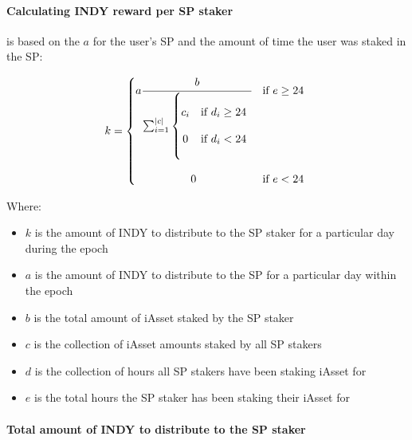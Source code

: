 \documentclass{article}
\begin{document}
\begin{sloppypar}
\filbreak

\hypertarget{calculating-indy-reward-per-sp-staker}{%
\paragraph{Calculating INDY reward per SP
staker}\label{calculating-indy-reward-per-sp-staker}}

is based on the \(a\) for the user's SP and the amount of time the user
was staked in the SP:

\[k = \left\{ \begin{matrix}
  a \cfrac{b}{\sum_{i = 1}^{\left| c \right|}\left\{ \begin{matrix}
    \\
    c_{i} & \text{if\ }d_{i} \geq 24 \\ \\
    0 & \text{if\ }d_{i} < 24 \\ \\
    \end{matrix} \right.\ } & \text{if\ }e \geq 24 \\ \\
  0 & \text{if\ }e < 24 \\
  \end{matrix} \right.\ \]

Where:

\begin{itemize}
\item
  \(k\) is the amount of INDY to distribute to the SP staker for a
  particular day during the epoch
\item
  \(a\) is the amount of INDY to distribute to the SP for a particular
  day within the epoch
\item
  \(b\) is the total amount of iAsset staked by the SP staker
\item
  \(c\) is the collection of iAsset amounts staked by all SP stakers
\item
  \(d\) is the collection of hours all SP stakers have been staking
  iAsset for
\item
  \(e\) is the total hours the SP staker has been staking their iAsset
  for
\end{itemize}

\hypertarget{total-amount-of-indy-to-distribute-to-the-sp-staker}{%
\paragraph{Total amount of INDY to distribute to the SP
staker}\label{total-amount-of-indy-to-distribute-to-the-sp-staker}}


\end{sloppypar}
\end{document}
